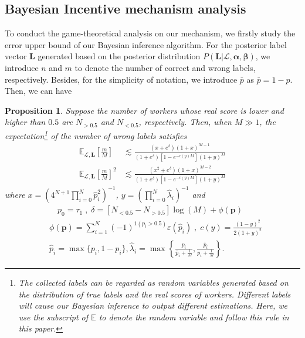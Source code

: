 \documentclass{article}
\makeatletter
\newtheorem{proposition}[theorem]{Proposition}
\renewenvironment{proof}[1][\proofname]{\par
  \vspace{-\topsep}%
  \pushQED{\qed}%
  \normalfont
  \topsep0pt \partopsep0pt %
  \trivlist
  \item[\hskip\labelsep
        \itshape
    #1\@addpunct{.}]\ignorespaces
}{%
  \popQED\endtrivlist\@endpefalse
  \addvspace{0pt plus 0pt} %
}
\makeatother
\begin{document}
\subsection{Bayesian Incentive mechanism analysis}
To conduct the game-theoretical analysis on our mechanism, we firstly study the error upper bound of our Bayesian inference algorithm.
For the posterior label vector $\bm{L}$ generated based on the posterior distribution $P(\bm{L}|\mathcal{L},\bm{\alpha}, \bm{\beta})$, we introduce $n$ and $m$ to denote the number of correct and wrong labels, respectively.
Besides, for the simplicity of notation, we introduce $\bar{p}$ as $\bar{p}=1-p$.
Then, we can have
\begin{proposition}
\label{ConvBound}
Suppose the number of workers whose real score is lower and higher than $0.5$ are $N_{>0.5}$ and $N_{<0.5}$, respectively.
Then, when $M\gg 1$, the expectation\footnote{The collected labels can be regarded as random variables generated based on the distribution of true labels and the real scores of workers. Different labels will cause our Bayesian inference to output different estimations. Here, we use the subscript of $\mathbb{E}$ to denote the random variable and follow this rule in this paper.} of the number of wrong labels satisfies
\begin{equation*}
\begin{split}
\mathbb{E}_{\mathcal{L},\bm{L}}\left[\frac{m}{M}\right]&\lesssim \frac{(x+e^{\delta})(1+x)^{M-1}}{(1+e^{\delta})[1-e^{-c(y)M}](1+y)^{M}}\\
\mathbb{E}_{\mathcal{L},\bm{L}}\left[\frac{m}{M}\right]^2&\lesssim \frac{(x^2+e^{\delta})(1+x)^{M-2}}{(1+e^{\delta})[1-e^{-c(y)M}](1+y)^{M}}
\end{split}
\end{equation*}
where $x=\left(4^{N+1}\prod_{i=0}^{N}\hat{p}^{2}_i\right)^{-1}$, $y=\left(\prod_{i=0}^{N}\hat{\lambda}_{i}\right)^{-1}$ and
\begin{equation*}
\begin{split}
&\quad p_0=\tau_1\;,\;\delta = [N_{<0.5}-N_{>0.5}]\log(M)+\phi(\bm{p})\\
&\phi(\bm{p})={\sum}_{i=1}^{N}(-1)^{1(p_i>0.5)}\varepsilon(\hat{p}_i)\;,\; c(y)=\frac{(1-y)^2}{2(1+y)^{2}}\\
&\hat{p}_i=\max\{p_i, 1-p_i\}, \hat{\lambda}_i=\max\left\{\frac{p_i}{\bar{p}_i+\frac{1}{M}},\frac{\bar{p}_i}{p_i+\frac{1}{M}}\right\}.
\end{split}
\end{equation*}
\begin{proof}

\end{proof}
\end{proposition}
\end{document}

